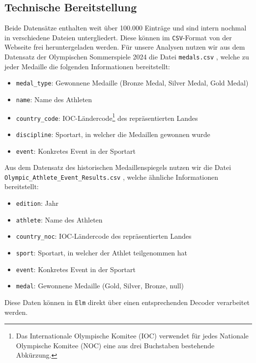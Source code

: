 \subsection{Technische Bereitstellung}
Beide Datensätze \cite{kaggleOly24, kaggleOlyHist} enthalten weit über 100.000 Einträge und sind intern nochmal in verschiedene Dateien untergliedert. Diese können im \texttt{CSV}-Format von der Webseite frei heruntergeladen werden. Für unsere Analysen nutzen wir aus dem Datensatz der Olympischen Sommerspiele 2024 die Datei \texttt{medals.csv} \cite{kaggleOly24}, welche zu jeder Medaille die folgenden Informationen bereitstellt:
\begin{itemize}
    \item \texttt{medal\_type}: Gewonnene Medaille (Bronze Medal, Silver Medal, Gold Medal)
    \item \texttt{name}: Name des Athleten
    \item \texttt{country\_code}: IOC-Ländercode\footnote{Das Internationale Olympische Komitee (IOC) verwendet für jedes Nationale Olympische Komitee (NOC) eine aus drei Buchstaben bestehende Abkürzung.} des repräsentierten Landes
    \item \texttt{discipline}: Sportart, in welcher die Medaillen gewonnen wurde
    \item \texttt{event}: Konkretes Event in der Sportart
\end{itemize}
Aus dem Datensatz des historischen Medaillenspiegels nutzen wir die Datei\\\texttt{Olympic\_Athlete\_Event\_Results.csv} \cite{kaggleOlyHist}, welche ähnliche Informationen bereitstellt:
\begin{itemize}
    \item \texttt{edition}: Jahr
    \item \texttt{athlete}: Name des Athleten
    \item \texttt{country\_noc}: IOC-Ländercode des repräsentierten Landes
    \item \texttt{sport}: Sportart, in welcher der Athlet teilgenommen hat
    \item \texttt{event}: Konkretes Event in der Sportart
    \item \texttt{medal}: Gewonnene Medaille (Gold, Silver, Bronze, null)
\end{itemize}
Diese Daten können in \texttt{Elm} direkt über einen entsprechenden Decoder verarbeitet werden.\\

